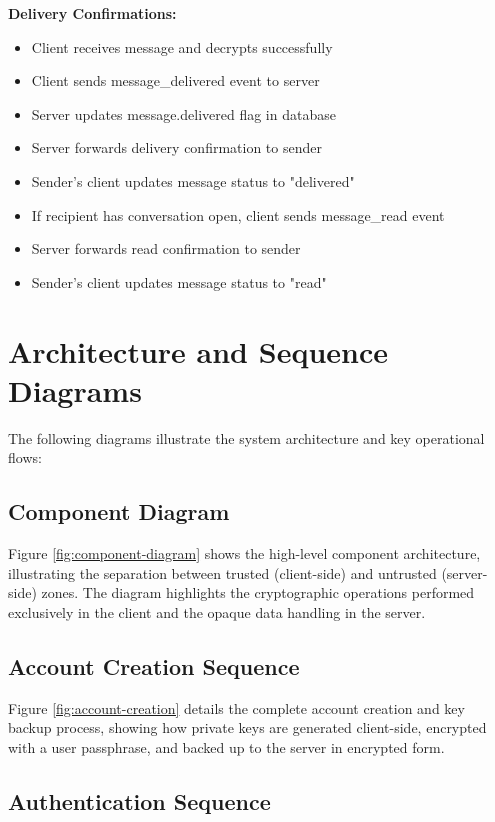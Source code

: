 \textbf{Delivery Confirmations:}
\begin{itemize}
    \item Client receives message and decrypts successfully
    \item Client sends message\_delivered event to server
    \item Server updates message.delivered flag in database
    \item Server forwards delivery confirmation to sender
    \item Sender's client updates message status to "delivered"
    \item If recipient has conversation open, client sends message\_read event
    \item Server forwards read confirmation to sender
    \item Sender's client updates message status to "read"
\end{itemize}

\section{Architecture and Sequence Diagrams}

The following diagrams illustrate the system architecture and key operational flows:

\subsection{Component Diagram}

Figure \ref{fig:component-diagram} shows the high-level component architecture, illustrating the separation between trusted (client-side) and untrusted (server-side) zones. The diagram highlights the cryptographic operations performed exclusively in the client and the opaque data handling in the server.

\subsection{Account Creation Sequence}

Figure \ref{fig:account-creation} details the complete account creation and key backup process, showing how private keys are generated client-side, encrypted with a user passphrase, and backed up to the server in encrypted form.

\subsection{Authentication Sequence}

